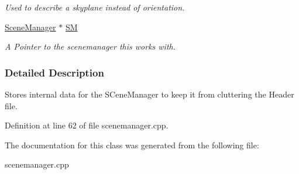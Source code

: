 \begin{DoxyCompactItemize}
\begin{DoxyCompactList}\small\item\em Used to describe a skyplane instead of orientation. \item\end{DoxyCompactList}\item 
\hypertarget{classphys_1_1internal_1_1SceneManagerData_afd470b7bdba16d0840ce18bb1846fa82}{
\hyperlink{classphys_1_1SceneManager}{SceneManager} $\ast$ \hyperlink{classphys_1_1internal_1_1SceneManagerData_afd470b7bdba16d0840ce18bb1846fa82}{SM}}
\label{classphys_1_1internal_1_1SceneManagerData_afd470b7bdba16d0840ce18bb1846fa82}

\begin{DoxyCompactList}\small\item\em A Pointer to the scenemanager this works with. \item\end{DoxyCompactList}\end{DoxyCompactItemize}


\subsubsection{Detailed Description}
Stores internal data for the SCeneManager to keep it from cluttering the Header file. 

Definition at line 62 of file scenemanager.cpp.



The documentation for this class was generated from the following file:\begin{DoxyCompactItemize}
\item 
scenemanager.cpp\end{DoxyCompactItemize}
